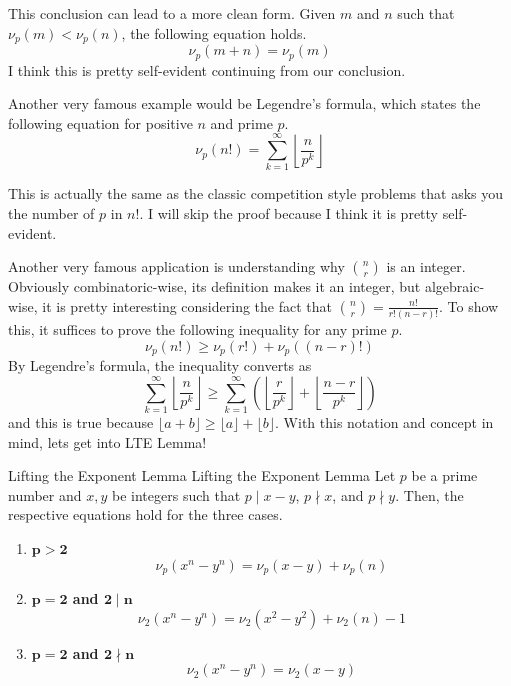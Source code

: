 \documentclass[../../../main.tex]{subfiles}
\begin{document}
This conclusion can lead to a more clean form. Given $m$ and $n$
such that $\nu_p (m) < \nu_p (n)$, the following equation holds.
\[
\nu_p (m + n) = \nu_p (m)
\]
I think this is pretty self-evident continuing from our conclusion.

\begin{important}
Another very famous example would be Legendre's formula, which states
the following equation for positive $n$ and prime $p$.
\vspace{-0.8\baselineskip}
\[
\nu_p (n!)
= \sum_{k=1}^\infty \left\lfloor \frac{n}{p^k} \right\rfloor
\]
\end{important}

This is actually the same as the classic competition style problems
that asks you the number of $p$ in $n!$. I will skip the proof because
I think it is pretty self-evident.

Another very famous application is understanding why $\binom{n}{r}$ is
an integer. Obviously combinatoric-wise, its definition makes it an
integer, but algebraic-wise, it is pretty interesting considering the
fact that $\binom{n}{r} = \frac{n!}{r! (n-r)!}$. To show this,
it suffices to prove the following inequality for any prime $p$.
\[
\nu_p (n!) \geq \nu_p (r!) + \nu_p ((n-r)!)
\]
By Legendre's formula, the inequality converts as
\[
\sum_{k=1}^\infty \left\lfloor \frac{n}{p^k} \right\rfloor
\geq \sum_{k=1}^\infty \left(
    \left\lfloor \frac{r}{p^k} \right\rfloor +
    \left\lfloor \frac{n-r}{p^k} \right\rfloor
\right)
\]
and this is true because $\lfloor a + b \rfloor \geq \lfloor a \rfloor
+ \lfloor b \rfloor$. With this notation and concept in mind,
lets get into LTE Lemma!

\begin{theorem}
{Lifting the Exponent Lemma}
{Lifting the Exponent Lemma}
Let $p$ be a prime number and $x, y$ be integers such that
$p \mid x - y$, $p \nmid x$, and $p \nmid y$. Then, the respective
equations hold for the three cases.
\begin{enumerate}
\item[I.] $\mathbf{p > 2}$
\[
\nu_p (x^n - y^n) = \nu_p (x - y) + \nu_p (n)
\]

\item[II.] \textbf{$\mathbf{p = 2}$ and $\mathbf{2 \mid n}$}
\[
\nu_2 (x^n - y^n) = \nu_2 (x^2 - y^2) + \nu_2 (n) - 1
\]

\item[III.] \textbf{$\mathbf{p = 2}$ and $\mathbf{2 \nmid n}$}
\vspace{-0.8\baselineskip}
\[
\nu_2 (x^n - y^n) = \nu_2 (x - y)
\]
\end{enumerate}
\end{theorem}
\end{document}
